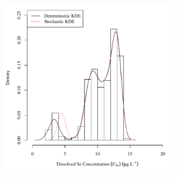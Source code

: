 


\subfiguretop
\begin{landscape}
	\begin{figure}
		\begin{subfigure}{0.7\textwidth}
			\centering
			\includegraphics[width=\tableCustomSize]{"Figures/Results_DSR/Stochastic/c d&s est D101C"}
		\end{subfigure}%
		\begin{subfigure}{0.7\textwidth}
			\centering

\end{subfigure}
\end{figure}
\end{landscape}
